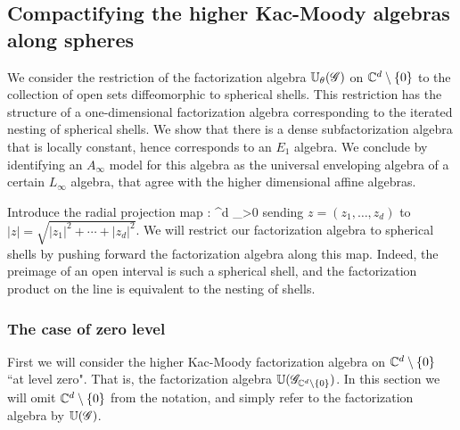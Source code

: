 \documentclass[10pt]{amsart}
\begin{document}

\subsection{Compactifying the higher Kac-Moody algebras along spheres}

We consider the restriction of the factorization algebra $\mathbb U_\theta (\mathscr G)$ on $\mathbb C^{d} \setminus \{0\}$ to the collection of open sets diffeomorphic to spherical shells.
This restriction has the structure of a one-dimensional factorization algebra corresponding to the iterated nesting of spherical shells. 
We show that there is a dense subfactorization algebra that is locally constant, hence corresponds to an $E_1$ algebra.
We conclude by identifying an $A_\infty$ model for this algebra as the universal enveloping algebra of a certain $L_\infty$ algebra, that agree with the higher dimensional affine algebras.

Introduce the radial projection map
\ben
\rho : \CC^d  \to \RR_{>0}
\een
sending $z = (z_1, \ldots, z_d)$ to $|z| = \sqrt{|z_1|^2 + \cdots + |z_d|^2}$. 
We will restrict our factorization algebra to spherical shells by pushing forward the factorization algebra along this map.
Indeed, the preimage of an open interval is such a spherical shell, and the factorization product on the line is equivalent to the nesting of shells. 

\subsubsection{The case of zero level}

First we will consider the higher Kac-Moody factorization algebra on $\mathbb C^d \setminus \{0\}$ ``at level zero". That is, the factorization algebra $\mathbb U(\mathscr G_{\mathbb C^d \setminus\{0\}})$.
In this section we will omit $\mathbb C^d \setminus \{0\}$ from the notation, and simply refer to the factorization algebra by $\mathbb U(\mathscr G)$. 
\end{document}
